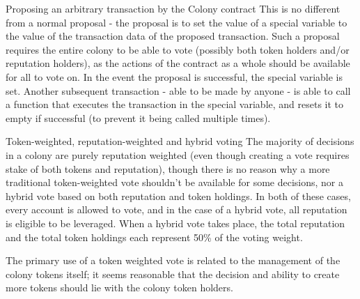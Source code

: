 Proposing an arbitrary transaction by the Colony contract
This is no different from a normal proposal - the proposal is to set the value of a special variable to the value of the transaction data of the proposed transaction. Such a proposal requires the entire colony to be able to vote (possibly both token holders and/or reputation holders), as the actions of the contract as a whole should be available for all to vote on. In the event the proposal is successful, the special variable is set. Another subsequent transaction - able to be made by anyone - is able to call a function that executes the transaction in the special variable, and resets it to empty if successful (to prevent it being called multiple times).

Token-weighted, reputation-weighted and hybrid voting
The majority of decisions in a colony are purely reputation weighted (even though creating a vote requires stake of both tokens and reputation), though there is no reason why a more traditional token-weighted vote shouldn't be available for some decisions, nor a hybrid vote based on both reputation and token holdings. In both of these cases, every account is allowed to vote, and in the case of a hybrid vote, all reputation is eligible to be leveraged. When a hybrid vote takes place, the total reputation and the total token holdings each represent 50\% of the voting weight.

The primary use of a token weighted vote is related to the management of the colony tokens itself; it seems reasonable that the decision and ability to create more tokens should lie with the colony token holders.
